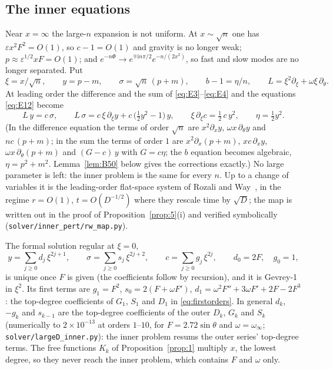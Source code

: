 \documentclass{amsart}
\numberwithin{equation}{section}
\theoremstyle{plain}
\theoremstyle{definition}
\theoremstyle{remark}
\newcommand{\winf}{\omega_\infty}
\newcommand{\eps}{\varepsilon}
\newcommand{\iu}{\mathrm{i}}
\newcommand{\repo}[1]{\texttt{#1}}
\begin{document}
\subsection{The inner equations}
Near $x = \infty$ the large-$n$ expansion is not uniform. At $x \sim \sqrt n$ one has $\eps x^2F^2 = O(1)$, so
$c - 1 = O(1)$ and gravity is no longer weak; $p \approx \eps^{1/2}xF = O(1)$; and $e^{-n\Phi} \to e^{\mp\iu n\pi/2}e^{-n/(2x^2)}$,
so fast and slow modes are no longer separated. Put
\begin{equation}\label{eq:innervars}
\xi = x/\sqrt n,\qquad y = p - m,\qquad \sigma = \sqrt n\,(p+m),\qquad b - 1 = \eta/n,\qquad
L = \xi^2\partial_\xi + \omega\xi\,\partial_\theta .
\end{equation}
At leading order the difference and the sum of \eqref{eq:E3}--\eqref{eq:E4} and the equations \eqref{eq:E12} become
\begin{equation}\label{eq:inner}
L\,y = c\,\sigma, \qquad
L\,\sigma = c\,\xi\,\partial_\xi y + c\,\big(\tfrac12 y^2 - 1\big)\,y, \qquad
\xi\,\partial_\xi c = \tfrac12\,c\,y^2 , \qquad \eta = \tfrac12 y^2 .
\end{equation}
(In the difference equation the terms of order $\sqrt n$ are $x^2\partial_x y$, $\omega x\,\partial_\theta y$ and
$nc\,(p+m)$; in the sum the terms of order $1$ are $x^2\partial_x(p+m)$, $xc\,\partial_x y$, $\omega x\,\partial_\theta(p+m)$
and $(G - c)\,y$ with $G = c\eta$; the $b$ equation becomes algebraic, $\eta = p^2 + m^2$. Lemma~\ref{lem:B50} below gives
the corrections exactly.) No large parameter is left: the inner problem is the same for every $n$. Up to a change of
variables it is the leading-order flat-space system of Rozali and Way~\cite[Sec.~2.2]{RozaliWay2018}, in the regime $r =
O(1)$, $t = O(D^{-1/2})$ where they rescale time by $\sqrt D$; the map is written out in the proof of
Proposition~\ref{prop:5}(i) and verified symbolically (\repo{solver/inner\_pert/rw\_map.py}).

The formal solution regular at $\xi = 0$,
\begin{equation}\label{eq:innerseries}
y = \sum_{j\ge0} d_j\,\xi^{2j+1},\qquad \sigma = \sum_{j\ge0} s_j\,\xi^{2j+2},\qquad c = \sum_{j\ge0} g_j\,\xi^{2j},\qquad
d_0 = 2F,\quad g_0 = 1,
\end{equation}
is unique once $F$ is given (the coefficients follow by recursion), and it is Gevrey-1 in $\xi^2$. Its first terms are
$g_1 = F^2$, $s_0 = 2(F + \omega F')$, $d_1 = \omega^2F'' + 3\omega F' + 2F - 2F^3$: the top-degree coefficients of $G_1$,
$S_1$ and $D_1$ in \eqref{eq:firstorders}. In general $d_k$, $-g_k$ and $s_{k-1}$ are the top-degree coefficients of the
outer $D_k$, $G_k$ and $S_k$ (numerically to $2\times10^{-13}$ at orders $1$--$10$, for $F = 2.72\sin\theta$ and
$\omega = \winf$; \repo{solver/largeD\_inner.py}): the inner problem resums the outer series' top-degree terms. The free
functions $K_k$ of Proposition~\ref{prop:1} multiply $x$, the lowest degree, so they never reach the inner problem, which
contains $F$ and $\omega$ only.
\end{document}
